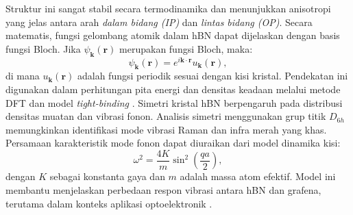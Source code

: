 Struktur ini sangat stabil secara termodinamika dan menunjukkan anisotropi yang jelas antara arah \emph{dalam bidang (IP)} dan \emph{lintas bidang (OP)}. Secara matematis, fungsi gelombang atomik dalam hBN dapat dijelaskan dengan basis fungsi Bloch. Jika \(\psi_{\mathbf{k}}(\mathbf{r})\) merupakan fungsi Bloch, maka:
\begin{equation}
    \psi_{\mathbf{k}}(\mathbf{r}) = e^{i\mathbf{k}\cdot\mathbf{r}} u_{\mathbf{k}}(\mathbf{r}),
\end{equation}
di mana \(u_{\mathbf{k}}(\mathbf{r})\) adalah fungsi periodik sesuai dengan kisi kristal. Pendekatan ini digunakan dalam perhitungan pita energi dan densitas keadaan melalui metode DFT dan model \emph{tight-binding} \citep{CastroNeto2009}.
Simetri kristal hBN berpengaruh pada distribusi densitas muatan dan vibrasi fonon. Analisis simetri menggunakan grup titik \(D_{6h}\) memungkinkan identifikasi mode vibrasi Raman dan infra merah yang khas. Persamaan karakteristik mode fonon dapat diuraikan dari model dinamika kisi:
\begin{equation}
    \omega^2 = \frac{4K}{m}\sin^2\left(\frac{qa}{2}\right),
\end{equation}
dengan \(K\) sebagai konstanta gaya dan \(m\) adalah massa atom efektif. Model ini membantu menjelaskan perbedaan respon vibrasi antara hBN dan grafena, terutama dalam konteks aplikasi optoelektronik \citep{Wang2017}.

